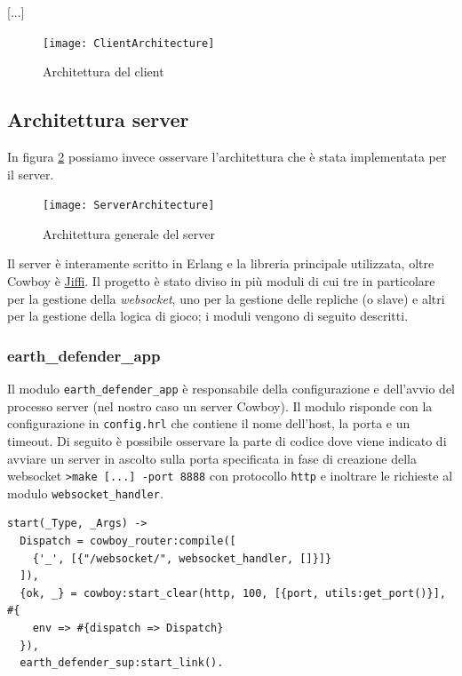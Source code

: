 \documentclass[paper=a4, fontsize=11pt]{scrartcl} %
\numberwithin{equation}{section} %
\numberwithin{figure}{section} %
\numberwithin{table}{section} %
\begin{document}
[...]

\begin{figure}
\centering
\texttt{[image: ClientArchitecture]}
\caption{Architettura del client}
\label{ClientArc}
\end{figure}

\subsection{Architettura server}
In figura \ref{ServerArc} possiamo invece osservare l'architettura che è stata implementata per il server.

\begin{figure}
\centering
\texttt{[image: ServerArchitecture]}
\caption{Architettura generale del server}
\label{ServerArc}
\end{figure}

Il server è interamente scritto in Erlang e la libreria principale utilizzata, oltre Cowboy è \href{https://github.com/davisp/jiffy}{Jiffi}. Il progetto è stato diviso in più moduli di cui tre in particolare per la gestione della \textit{websocket}, uno per la gestione delle repliche (o slave) e altri per la gestione della logica di gioco; i moduli vengono di seguito descritti.
\subsubsection{earth\_defender\_app}
Il modulo \texttt{earth\_defender\_app} è responsabile della configurazione e dell'avvio del processo server (nel nostro caso un server Cowboy). Il modulo risponde con la configurazione in \texttt{config.hrl} che contiene il nome dell'host, la porta e un timeout.
Di seguito è possibile osservare la parte di codice dove viene indicato di avviare un server in ascolto sulla porta specificata in fase di creazione della websocket \texttt{>make [...] -port 8888} con protocollo \texttt{http} e inoltrare le richieste al modulo \texttt{websocket\_handler}.
\begin{lstlisting}[basicstyle=\footnotesize]
start(_Type, _Args) ->
  Dispatch = cowboy_router:compile([
    {'_', [{"/websocket/", websocket_handler, []}]}
  ]),
  {ok, _} = cowboy:start_clear(http, 100, [{port, utils:get_port()}], #{
    env => #{dispatch => Dispatch}
  }),
  earth_defender_sup:start_link().
\end{lstlisting}
\end{document}
